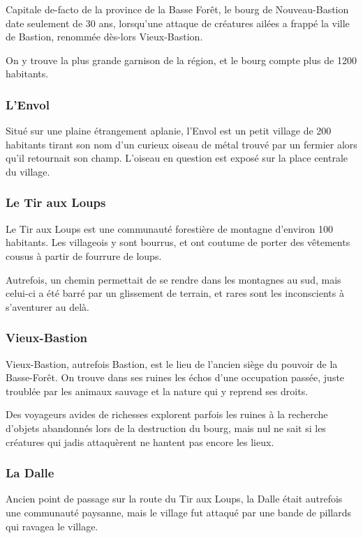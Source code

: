 Capitale de-facto de la province de la Basse Forêt, le bourg de Nouveau-Bastion date seulement de 30 ans, lorsqu'une attaque de créatures ailées a frappé la ville de Bastion, renommée dès-lors Vieux-Bastion.

On y trouve la plus grande garnison de la région, et le bourg compte plus de 1200 habitants.

\subsubsection*{L'Envol}

Situé sur une plaine étrangement aplanie, l'Envol est un petit village de 200 habitants tirant son nom d'un curieux oiseau de métal trouvé par un fermier alors qu'il retournait son champ. L'oiseau en question est exposé sur la place centrale du village.

\subsubsection*{Le Tir aux Loups}

Le Tir aux Loups est une communauté forestière de montagne d'environ 100 habitants. Les villageois y sont bourrus, et ont coutume de porter des vêtements cousus à partir de fourrure de loups.

Autrefois, un chemin permettait de se rendre dans les montagnes au sud, mais celui-ci a été barré par un glissement de terrain, et rares sont les inconscients à s'aventurer au delà.

\subsubsection*{Vieux-Bastion}

Vieux-Bastion, autrefois Bastion, est le lieu de l'ancien siège du pouvoir de la Basse-Forêt. On trouve dans ses ruines les échos d'une occupation passée, juste troublée par les animaux sauvage et la nature qui y reprend ses droits.

Des voyageurs avides de richesses explorent parfois les ruines à la recherche d'objets abandonnés lors de la destruction du bourg, mais nul ne sait si les créatures qui jadis attaquèrent ne hantent pas encore les lieux.

\subsubsection*{La Dalle}

Ancien point de passage sur la route du Tir aux Loups, la Dalle était autrefois une communauté paysanne, mais le village fut attaqué par une bande de pillards qui ravagea le village.

